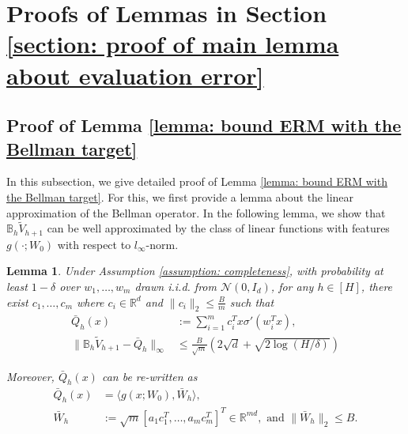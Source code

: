 \documentclass{article} \usepackage{iclr2023/iclr2023_conference,times}
\newtheorem{lemma}{Lemma}[section]
\begin{document}
 \section{Proofs of Lemmas in Section \ref{section: proof of main lemma about evaluation error}}
\label{section: proofs of intermediate lemmas for the main lemmas}


\subsection{Proof of Lemma \ref{lemma: bound ERM with the Bellman target}}
\label{subsection: proof of lemma D1}

In this subsection, we give detailed proof of Lemma \ref{lemma: bound ERM with the Bellman target}. For this, we first provide a lemma about the linear approximation of the Bellman operator. In the following lemma, we show that $\mathbb{B}_h \tilde{V}_{h+1}$ can be well approximated by the class of linear functions with features $g(\cdot; W_0)$ with respect to $l_{\infty}$-norm. 
\begin{lemma}
Under Assumption \ref{assumption: completeness}, with probability at least $1 - \delta$ over $w_1, \ldots, w_m$ drawn i.i.d. from $\mathcal{N}(0, I_d)$, for any $h \in [H]$, there exist $c_1, \ldots, c_m$ where $c_i \in \mathbb{R}^d$ and $\|c_i \|_2 \leq \frac{B}{m} $ such that 
\begin{align*}
    \bar{Q}_h(x) &:= \sum_{i=1}^m c_i^T x \sigma'(w^T_i x), \\
    \| \mathbb{B}_h \tilde{V}_{h+1} - \bar{Q}_h \|_{\infty} &\leq \frac{B}{\sqrt{m}}  (2 \sqrt{d} + \sqrt{2 \log (H / \delta)})
\end{align*}

Moreover, $\bar{Q}_h(x)$ can be re-written as 
\begin{align}
     \bar{Q}_h(x) &= \langle g(x; W_0), \bar{W}_h \rangle, \nonumber\\
\bar{W}_h &:= \sqrt{m} [ a_1 c_1^T, \ldots, a_m c_m^T ]^T \in \mathbb{R}^{md}, \text{ and } \| \bar{W}_h \|_2 \leq B. 
    \label{eq: bar W h}
\end{align}
\label{lemma: linear approximation for the Bellman target}
\end{lemma}
\end{document}

